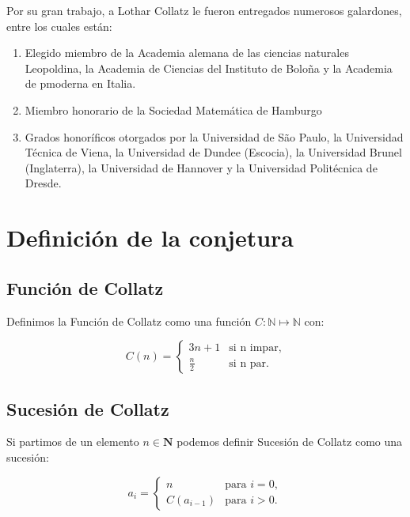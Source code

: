 Por su gran trabajo, a Lothar Collatz le fueron entregados numerosos galardones, entre los cuales están:
\begin{enumerate}
    \item Elegido miembro de la Academia alemana de las ciencias naturales Leopoldina, la Academia de Ciencias del Instituto de Boloña y la Academia de pmoderna en Italia.
    \item Miembro honorario de la Sociedad Matemática de Hamburgo
    \item Grados honoríficos otorgados por la Universidad de São Paulo, la Universidad Técnica de Viena, la Universidad de Dundee (Escocia), la Universidad Brunel (Inglaterra), la Universidad de Hannover y la Universidad Politécnica de Dresde.
\end{enumerate}






\section{Definición de la conjetura}

\subsection{Función de Collatz}

Definimos la Función de Collatz como una función $C:\mathbb{N}\mapsto\mathbb{N}$ con:

\begin{equation}
\label{C(n)}
    C(n) = \begin{cases}
    3n+1 & \text{si n impar},\\
    \frac{n}{2} & \text{si n par}.
    \end{cases}
\end{equation}

\subsection{Sucesión de Collatz}

Si partimos de un elemento $n \in \mathbf{N}$ podemos definir Sucesión de Collatz como una sucesión:

\begin{equation}
\label{SucesionCollatz}
    a_i = \begin{cases}
    n & \text{para } i=0,\\
    C(a_{i-1}) & \text{para } i>0.
    \end{cases}
\end{equation}

